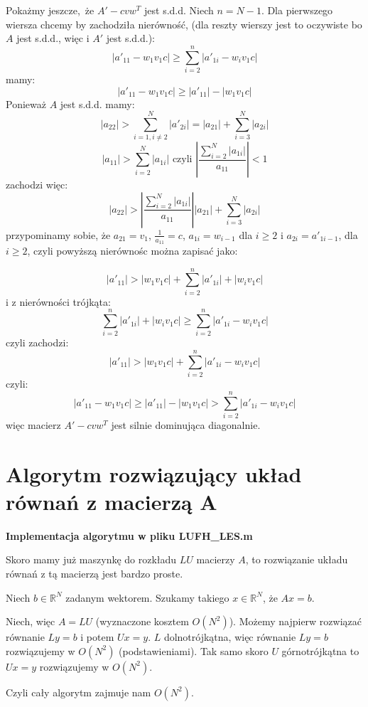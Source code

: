 \documentclass{article}
\begin{document}
Pokażmy jeszcze, że $A' - cvw^T$ jest s.d.d. \newline
Niech $n = N-1$. \newline
Dla pierwszego wiersza chcemy by zachodziła nierówność, (dla reszty wierszy jest to oczywiste bo $A$ jest s.d.d., więc i $A'$ jest s.d.d.):
$$ |a'_{11} - w_1v_1c| \ge \sum_{i=2}^n |a'_{1i} - w_iv_1c|$$
mamy:
$$ |a'_{11} - w_1v_1c| \ge |a'_{11}| - |w_1v_1c|$$
Ponieważ $A$ jest s.d.d. mamy:
$$|a_{22}| > \sum_{i = 1, i\neq2}^N|a'_{2i}| = |a_{21}| + \sum_{i=3}^N |a_{2i}| $$
$$ |a_{11}| > \sum_{i = 2}^N |a_{1i}| \mbox{ czyli } \left| \frac{\sum_{i = 2}^N |a_{1i}|}{a_{11}}\right| < 1 $$
zachodzi więc:
$$ |a_{22}| > \left| \frac{\sum_{i = 2}^N |a_{1i}|}{a_{11}}\right| |a_{21}| + \sum_{i=3}^N |a_{2i}| $$
przypominamy sobie, że $a_{21} = v_1$, $\frac{1}{a_{11}} = c$, $a_{1i} = w_{i-1}$ dla $i \ge 2$ i $a_{2i} = a'_{1 i-1}$, dla $i \ge 2$, czyli powyższą nierównośc można zapisać jako:


$$|a'_{11}| > |w_1v_1c| + \sum_{i=2}^n |a'_{1i}| + |w_iv_1c|$$
i z nierówności trójkąta:
$$ \sum_{i=2}^n |a'_{1i}| + |w_iv_1c| \ge \sum_{i=2}^n |a'_{1i} - w_iv_1c| $$
czyli zachodzi:
$$ |a'_{11}| > |w_1v_1c| + \sum_{i=2}^n |a'_{1i} - w_iv_1c| $$
czyli: 
$$ |a'_{11} - w_1v_1c| \ge |a'_{11}| - |w_1v_1c| > \sum_{i=2}^n |a'_{1i} - w_iv_1c| $$
więc macierz $A' - cvw^T$ jest silnie dominująca diagonalnie.

\section*{Algorytm rozwiązujący układ równań z macierzą A}

{\bf Implementacja algorytmu w pliku LUFH\_LES.m}

Skoro mamy już maszynkę do rozkładu $LU$ macierzy $A$, to rozwiązanie układu równań z tą macierzą jest bardzo proste.

Niech $b \in \mathbb{R}^N$ zadanym wektorem. \newline
Szukamy takiego $x \in \mathbb{R}^N$, że $Ax=b$. \newline

Niech, więc $A=LU$ (wyznaczone kosztem $O(N^2)$). \newline
Możemy najpierw rozwiązać równanie $Ly=b$ i potem $Ux = y$. \newline
$L$ dolnotrójkątna, więc równanie $Ly=b$ rozwiązujemy w $O(N^2)$ (podstawieniami). \newline
Tak samo skoro $U$ górnotrójkątna to $Ux=y$ rozwiązujemy w $O(N^2)$.

Czyli cały algorytm zajmuje nam $O(N^2)$.
\end{document}
